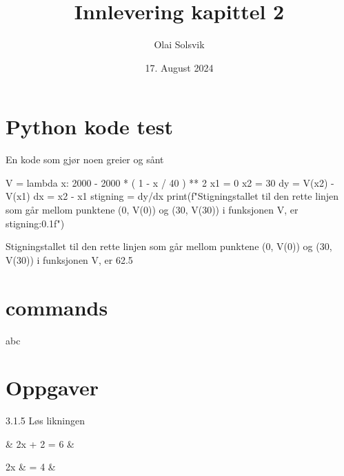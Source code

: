 \newcommand*{\shared}{../shared}


\title{Innlevering kapittel 2}
\date{17. August 2024}
\author{Olai Solsvik}


\maketitle
\tableofcontents
\hr

\section{Python kode test}
\begin{codebox}{En kode som gjør noen greier og sånt}
	\begin{pythoncode}
		V = lambda x: 2000 - 2000 * ( 1 - x / 40 ) ** 2
		x1 = 0
		x2 = 30
		dy = V(x2) - V(x1)
		dx = x2 - x1
		stigning = dy/dx
		print(f"Stigningstallet til den rette linjen som går mellom punktene (0, V(0)) og (30, V(30)) i funksjonen V, er {stigning:0.1f}")
	\end{pythoncode}


	\begin{coderesult}
		Stigningstallet til den rette linjen som går mellom punktene (0, V(0)) og (30, V(30)) i funksjonen V, er 62.5
	\end{coderesult}
\end{codebox}

\section{commands}

abc

\section{Oppgaver}
\begin{taskbox}{3.1.5}
	Løs likningen
	\begin{flalign*}
		 & 2x + 2 = 6 &
	\end{flalign*}
	\tcblower\vspace{-\baselineskip}
	\begin{flalign*}
		2x     & = 4 & \\
	\end{flalign*}
\end{taskbox}

